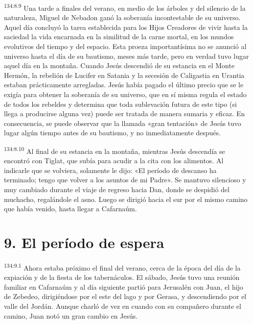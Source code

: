 \par
\textsuperscript{134:8.9} Una tarde a finales del verano, en medio de los árboles y del silencio de la naturaleza, Miguel de Nebadon ganó la soberanía incontestable de su universo. Aquel día concluyó la tarea establecida para los Hijos Creadores de vivir hasta la saciedad la vida encarnada en la similitud de la carne mortal, en los mundos evolutivos del tiempo y del espacio. Esta proeza importantísima no se anunció al universo hasta el día de su bautismo, meses más tarde, pero en verdad tuvo lugar aquel día en la montaña. Cuando Jesús descendió de su estancia en el Monte Hermón, la rebelión de Lucifer en Satania y la secesión de Caligastia en Urantia estaban prácticamente arregladas. Jesús había pagado el último precio que se le exigía para obtener la soberanía de su universo, que en sí misma regula el estado de todos los rebeldes y determina que toda sublevación futura de este tipo (si llega a producirse alguna vez) puede ser tratada de manera sumaria y eficaz. En consecuencia, se puede observar que la llamada «gran tentación» de Jesús tuvo lugar algún tiempo antes de su bautismo, y no inmediatamente después.

\par
\textsuperscript{134:8.10} Al final de su estancia en la montaña, mientras Jesús descendía se encontró con Tiglat, que subía para acudir a la cita con los alimentos. Al indicarle que se volviera, solamente le dijo: «El período de descanso ha terminado; tengo que volver a los asuntos de mi Padre». Se mantuvo silencioso y muy cambiado durante el viaje de regreso hacia Dan, donde se despidió del muchacho, regalándole el asno. Luego se dirigió hacia el sur por el mismo camino que había venido, hasta llegar a Cafarnaúm.

\section*{9. El período de espera}
\par
\textsuperscript{134:9.1} Ahora estaba próximo el final del verano, cerca de la época del día de la expiación y de la fiesta de los tabernáculos. El sábado, Jesús tuvo una reunión familiar en Cafarnaúm y al día siguiente partió para Jerusalén con Juan, el hijo de Zebedeo, dirigiéndose por el este del lago y por Gerasa, y descendiendo por el valle del Jordán. Aunque charló de vez en cuando con su compañero durante el camino, Juan notó un gran cambio en Jesús.

